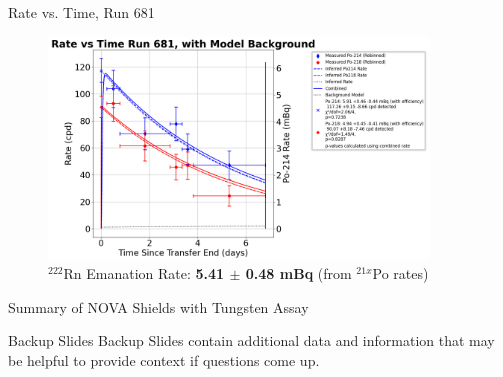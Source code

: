 \documentclass{beamer}
\begin{document}
\begin{frame}{Rate vs. Time, Run 681}
    \begin{figure}
        \begin{center}
            \includegraphics[width=0.9\textwidth]
            {Rate_vs_Time_Run_681,_with_Model_Background.png}
            \caption{$^{222}$Rn Emanation Rate: 
            \textbf{5.41 $\pm$ 0.48 mBq} (from $^{21x}$Po rates)}
        \end{center}
    \end{figure}    
\end{frame}

\begin{frame}{Summary of NOVA Shields with Tungsten Assay}
    
\end{frame}

\begin{frame}{Backup Slides}
    Backup Slides contain additional data and information that may be helpful
    to provide context if questions come up.
\end{frame}
\end{document}
